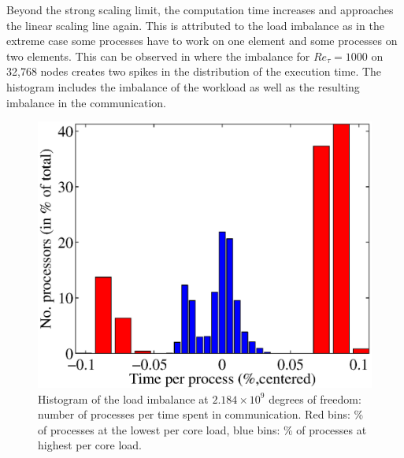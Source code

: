 \documentclass{sig-alternate}
\begin{document}
Beyond the strong scaling limit, the computation time increases and
approaches the linear scaling line again. This is attributed to the load
imbalance as in the extreme case some processes have to work on one element and
some processes on two elements. This can be observed in
where the imbalance for $Re_{\tau}=1000$ on 32,768 nodes creates two spikes in the
distribution of the execution time. The histogram includes the imbalance of
the workload as well as the resulting imbalance in the communication.
\begin{figure}
  \centering
  \includegraphics[width=\linewidth]{./figures/loadbalance.eps}
  \caption{Histogram of the load imbalance at $2.184\times10^9$ degrees of freedom: number of processes per time spent in communication. Red bins: \% of processes at the lowest per core load, blue bins: \% of processes at highest per core load.}
  \label{fig:imbalancehist}
\end{figure}
\end{document}
